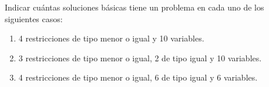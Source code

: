 Indicar cuántas soluciones básicas tiene un problema en cada uno de los siguientes casos:
\begin{enumerate}[label=\alph*)]

    \item 4 restricciones de tipo menor o igual y 10 variables.
        
    \item 3 restricciones de tipo menor o igual, 2 de tipo igual y 10 variables.
    
    \item 4 restricciones de tipo menor o igual, 6 de tipo igual y 6 variables.
    
\end{enumerate}